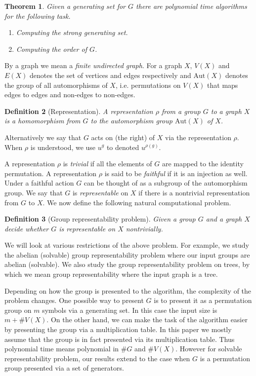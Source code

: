\documentclass[a4paper,11pt]{article}
\newtheorem{theorem}{Theorem}[section]
\newtheorem{definition}[theorem]{Definition}
\newcommand{\Aut}[1]{\ensuremath{\mathrm{Aut}\left(#1\right)}}
\newcommand{\Vertex}[1]{\ensuremath{V\left(#1\right)}}
\newcommand{\Edge}[1]{\ensuremath{E\left(#1\right)}}
\begin{document}
\begin{theorem}\label{thm-perm-polytime}
  Given a generating set for $G$ there are polynomial time algorithms
  for the following task.
  \begin{enumerate}
  \item Computing the strong generating set.
  \item Computing the order of $G$.
  \end{enumerate}
\end{theorem}

By a graph we mean a \emph{finite undirected graph}. For a graph $X$,
$\Vertex{X}$ and $\Edge{X}$ denotes the set of vertices and edges
respectively and $\Aut{X}$ denotes the group of all
automorphisms of $X$, i.e. permutations on $\Vertex{X}$ that maps
edges to edges and non-edges to non-edges. 

\begin{definition}[Representation]
  A representation $\rho$ from a group $G$ to a graph $X$ is a
  homomorphism from $G$ to the automorphism group $\Aut{X}$ of $X$.
\end{definition}

Alternatively we say that $G$ acts on (the right) of $X$ via the
representation $\rho$. When $\rho$ is understood, we use $u^g$ to
denoted $u^{\rho(g)}$. 

A representation $\rho$ is \emph{trivial} if all the elements of $G$
are mapped to the identity permutation. A representation $\rho$ is
said to be \emph{faithful} if it is an injection as well. Under a
faithful action $G$ can be thought of as a subgroup of the
automorphism group. We say that $G$ is \emph{representable} on $X$
 if there is a nontrivial representation from $G$ to
$X$. We now define the following natural computational problem.

\begin{definition}[Group representability problem]
  Given a group $G$ and a graph $X$ decide whether $G$ is
  representable on $X$ nontrivially.
\end{definition}

We will look at various restrictions of the above problem. For example,
we study the abelian (solvable) group representability problem where
our input groups are abelian (solvable). We also study the group
representability problem on trees, by which we mean group
representability where the input graph is a tree.

Depending on how the group is presented to the algorithm, the
complexity of the problem changes. One possible way to present $G$ is
to present it as a permutation group on $m$ symbols via a generating
set. In this case the input size is $m + \# V(X)$. On the other hand,
we can make the task of the algorithm easier by presenting the group
via a multiplication table. In this paper we mostly assume that the
group is in fact presented via its multiplication table. Thus
polynomial time means polynomial in $\# G$ and $\# V(X)$. However for
solvable representability problem, our results extend to the case when
$G$ is a permutation group presented via a set of generators.
\end{document}
